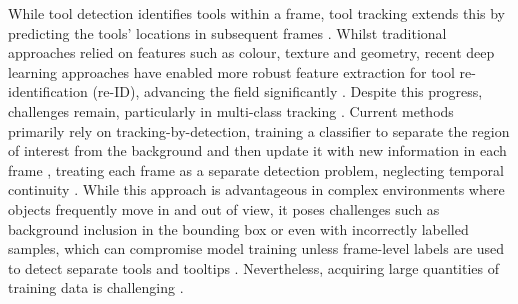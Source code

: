 While tool detection identifies tools within a frame, tool tracking extends this by predicting the tools’ locations in subsequent frames \cite{SurgiTrack}. Whilst traditional approaches relied on features such as colour, texture and geometry, recent deep learning approaches have enabled more robust feature extraction for tool re-identification (re-ID), advancing the field significantly \cite{SurgiTrack}. Despite this progress, challenges remain, particularly in multi-class tracking \cite{nwoye_2019, nwoye:tel-03855189}. Current methods primarily rely on tracking-by-detection, training a classifier to separate the region of interest from the background and then update it with new information in each frame \cite{ali2023comprehensivesurveyrecentdeep}, treating each frame as a separate detection problem, neglecting temporal continuity \cite{paley_crowdsourced_2021}. While this approach is advantageous in complex environments where objects frequently move in and out of view, it poses challenges such as background inclusion in the bounding box or even with incorrectly labelled samples, which can compromise model training unless frame-level labels are used to detect separate tools and tooltips \cite{ali2023comprehensivesurveyrecentdeep}. Nevertheless, acquiring large quantities of training data is challenging \cite{bodenstedt_comparative_2018}.

